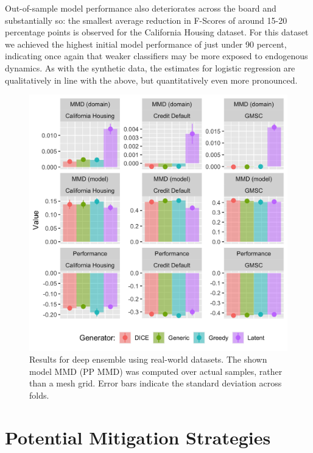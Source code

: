 \documentclass[conference,final,]{IEEEtran}
\theoremstyle{definition}
\theoremstyle{definition}
\theoremstyle{definition}
\theoremstyle{definition}
\theoremstyle{remark}
\begin{document}
Out-of-sample model performance also deteriorates across the board and substantially so: the smallest average reduction in F-Scores of around 15-20 percentage points is observed for the California Housing dataset. For this dataset we achieved the highest initial model performance of just under 90 percent, indicating once again that weaker classifiers may be more exposed to endogenous dynamics. As with the synthetic data, the estimates for logistic regression are qualitatively in line with the above, but quantitatively even more pronounced.

\begin{figure}

{\centering \includegraphics[width=0.9\linewidth]{www/real_world_results} 

}

\caption{Results for deep ensemble using real-world datasets. The shown model MMD (PP MMD) was computed over actual samples, rather than a mesh grid. Error bars indicate the standard deviation across folds.}\label{fig:real}
\end{figure}

\hypertarget{mitigate}{%
\section{Potential Mitigation Strategies}\label{mitigate}}
\end{document}
